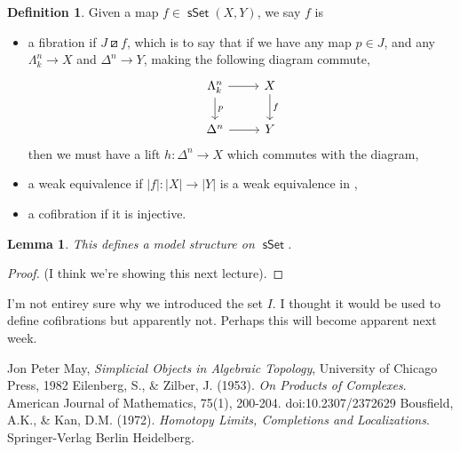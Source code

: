 \documentclass{amsart}
\newcommand{\catname}[1]{{\sffamily\upshape{{#1}}}}
\newcommand{\topp}{\catname{Top}}
\DeclareMathOperator{\msset}{\mathsf{sSet}}
\newtheorem{lemma}[theorem]{Lemma}
\theoremstyle{definition}
\newtheorem{definition}[theorem]{Definition}
\begin{document}
\begin{definition}
  Given a map $f\in \msset (X,Y)$, we say $f$ is
  \begin{itemize}
  \item a fibration if $J \boxslash f$, which is to say that if
    we have any map $p\in J$, and any $\Lambda^n_k \to X$
    and $\Delta^n \to Y$, making the following diagram commute,
    \[
    \begin{tikzcd}
      \Lambda^n_k \arrow[r] \arrow[d, "p"] & X \arrow[d, "f"] \\
      \Delta^n \arrow[r] &Y
    \end{tikzcd}
  \]
  then we must have a lift $h: \Delta^n \to X$ which commutes with the diagram,
\item a weak equivalence if $|f|: |X|\to |Y|$ is a weak equivalence in
  \topp,
\item a cofibration if it is injective.
\end{itemize}
\end{definition}
\begin{lemma}
  This defines a model structure on $\msset$.
\end{lemma}
\begin{proof}
  (I think we're showing this next lecture).
\end{proof}
I'm not entirey sure why we introduced the set $I$. I thought it would be used
to define cofibrations but apparently not. Perhaps this will become
apparent next week.


\begin{thebibliography}{10}
 Jon Peter May, {\it Simplicial Objects in Algebraic Topology}, University of Chicago Press, 1982
 Eilenberg, S., \& Zilber, J. (1953). {\it On Products of Complexes}. American Journal of Mathematics, 75(1), 200-204. doi:10.2307/2372629
 Bousfield, A.K., \& Kan, D.M. (1972). {\it Homotopy Limits, Completions and Localizations}. Springer-Verlag Berlin Heidelberg.
\end{thebibliography} 




\end{document}
